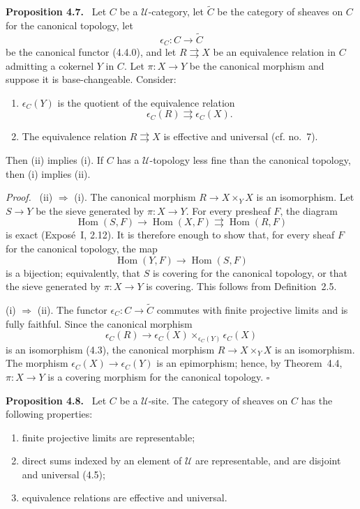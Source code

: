 \documentclass[11pt]{article}
\newcommand{\U}{\mathcal{U}}
\newcommand{\Hom}{\operatorname{Hom}}
\newcommand{\qedtext}{\hfill\(\square\)}
\newenvironment{statement}[1]{\par\medskip\noindent\textbf{#1.}\ }{\par\medskip}
\newenvironment{prooftext}{\par\noindent\emph{Proof.}\ }{\par\medskip}
\begin{document}
\begin{statement}{Proposition 4.7}
Let \(C\) be a \(\U\)-category, let \(\widetilde C\) be the category of sheaves on \(C\) for the canonical topology, let
\[
\epsilon_C:C\to\widetilde C
\]
be the canonical functor (4.4.0), and let \(R\rightrightarrows X\) be an equivalence relation in \(C\) admitting a cokernel \(Y\) in \(C\). Let \(\pi:X\to Y\) be the canonical morphism and suppose it is base-changeable. Consider:
\begin{enumerate}[label=(\roman*)]
\item \(\epsilon_C(Y)\) is the quotient of the equivalence relation
\[
\epsilon_C(R)\rightrightarrows \epsilon_C(X).
\]
\item The equivalence relation \(R\rightrightarrows X\) is effective and universal (cf. no.~7).
\end{enumerate}
Then (ii) implies (i). If \(C\) has a \(\U\)-topology less fine than the canonical topology, then (i) implies (ii).
\end{statement}

\begin{prooftext}
(ii) \(\Rightarrow\) (i). The canonical morphism \(R\to X\times_YX\) is an isomorphism. Let \(S\to Y\) be the sieve generated by \(\pi:X\to Y\). For every presheaf \(F\), the diagram
\[
\Hom(S,F)\longrightarrow \Hom(X,F)\rightrightarrows \Hom(R,F)
\]
is exact (Expos\'e~I, 2.12). It is therefore enough to show that, for every sheaf \(F\) for the canonical topology, the map
\[
\Hom(Y,F)\longrightarrow \Hom(S,F)
\]
is a bijection; equivalently, that \(S\) is covering for the canonical topology, or that the sieve generated by \(\pi:X\to Y\) is covering. This follows from Definition~2.5.

(i) \(\Rightarrow\) (ii). The functor \(\epsilon_C:C\to\widetilde C\) commutes with finite projective limits and is fully faithful. Since the canonical morphism
\[
\epsilon_C(R)\to \epsilon_C(X)\times_{\epsilon_C(Y)}\epsilon_C(X)
\]
is an isomorphism (4.3), the canonical morphism \(R\to X\times_YX\) is an isomorphism. The morphism \(\epsilon_C(X)\to\epsilon_C(Y)\) is an epimorphism; hence, by Theorem~4.4, \(\pi:X\to Y\) is a covering morphism for the canonical topology. \qedtext
\end{prooftext}

\begin{statement}{Proposition 4.8}
Let \(C\) be a \(\U\)-site. The category of sheaves on \(C\) has the following properties:
\begin{enumerate}[label=\alph*)]
\item finite projective limits are representable;
\item direct sums indexed by an element of \(\U\) are representable, and are disjoint and universal (4.5);
\item equivalence relations are effective and universal.
\end{enumerate}
\end{statement}
\end{document}
